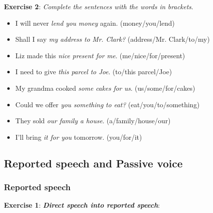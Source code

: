 \textbf{Exercise 2}: \textit{Complete the sentences with the words in brackets}.

\begin{itemize}

\item I will never \textit{lend you money} again. (money/you/lend)
\item Shall I say \textit{my address to Mr. Clark?} (address/Mr. Clark/to/my)
\item Liz made this \textit{nice present for me}. (me/nice/for/present)
\item I need to give \textit{this parcel to Joe}. (to/this parcel/Joe)
\item My grandma cooked \textit{some cakes for us}. (us/some/for/cakes)
\item Could we offer \textit{you something to eat?} (eat/you/to/something)
\item They sold \textit{our family a house}. (a/family/house/our)
\item I'll bring \textit{it for you} tomorrow. (you/for/it)

\end{itemize}

\subsection{Reported speech and Passive voice}

\subsubsection{Reported speech}

\textbf{Exercise 1}: \textit{\textbf{Direct speech into reported speech}}:

